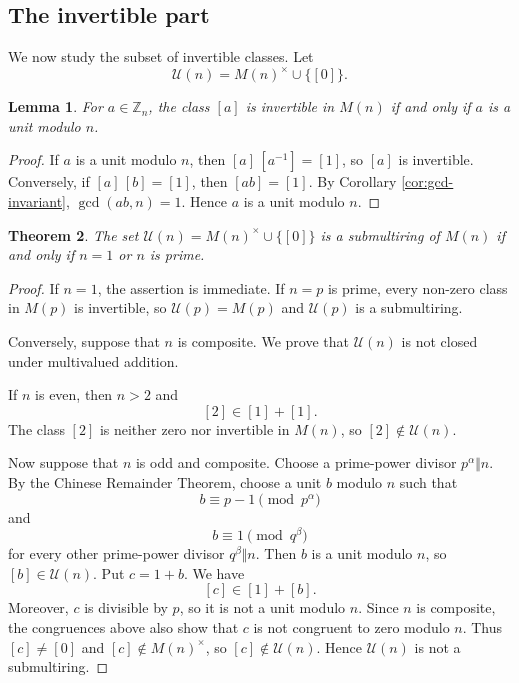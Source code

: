 \documentclass[a4paper,10pt]{article}
\newtheorem{teo}{Theorem}[section]
\newtheorem{lem}[teo]{Lemma} %
\newcommand{\cl}[1]{\left[#1\right]}
\newcommand{\U}{\mathcal U}
\begin{document}
\subsection{The invertible part}

We now study the subset of invertible classes.  Let
\[
        \U(n)=M(n)^\times\cup\{\cl0\}.
\]

\begin{lem}\label{lem:units-Mn}
For $a\in\mathbb Z_n$, the class $\cl a$ is invertible in $M(n)$ if and only if $a$ is a unit modulo $n$.
\end{lem}

\begin{proof}
If $a$ is a unit modulo $n$, then $\cl a\,\cl{a^{-1}}=\cl1$, so $\cl a$ is invertible.  Conversely, if $\cl a\,\cl b=\cl1$, then $\cl{ab}=\cl1$.  By Corollary \ref{cor:gcd-invariant}, $\gcd(ab,n)=1$.  Hence $a$ is a unit modulo $n$.
\end{proof}

\begin{teo}\label{teo:unit-submultiring}
The set $\U(n)=M(n)^\times\cup\{\cl0\}$ is a submultiring of $M(n)$ if and only if $n=1$ or $n$ is prime.
\end{teo}

\begin{proof}
If $n=1$, the assertion is immediate.  If $n=p$ is prime, every non-zero class in $M(p)$ is invertible, so $\U(p)=M(p)$ and $\U(p)$ is a submultiring.

Conversely, suppose that $n$ is composite.  We prove that $\U(n)$ is not closed under multivalued addition.

If $n$ is even, then $n>2$ and
\[
        \cl2\in\cl1+\cl1.
\]
The class $\cl2$ is neither zero nor invertible in $M(n)$, so $\cl2\notin\U(n)$.

Now suppose that $n$ is odd and composite.  Choose a prime-power divisor $p^\alpha\Vert n$.  By the Chinese Remainder Theorem, choose a unit $b$ modulo $n$ such that
\[
        b\equiv p-1\pmod{p^\alpha}
\]
and
\[
        b\equiv1\pmod{q^\beta}
\]
for every other prime-power divisor $q^\beta\Vert n$.  Then $b$ is a unit modulo $n$, so $\cl b\in\U(n)$.  Put $c=1+b$.  We have
\[
        \cl c\in\cl1+\cl b.
\]
Moreover, $c$ is divisible by $p$, so it is not a unit modulo $n$.  Since $n$ is composite, the congruences above also show that $c$ is not congruent to zero modulo $n$.  Thus $\cl c\ne\cl0$ and $\cl c\notin M(n)^\times$, so $\cl c\notin\U(n)$.  Hence $\U(n)$ is not a submultiring.
\end{proof}
\end{document}
